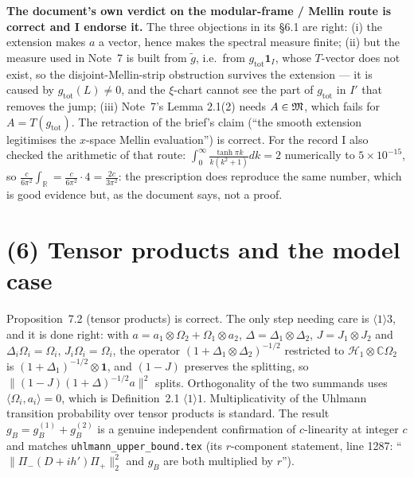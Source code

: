 \documentclass[11pt]{article}
\newcommand{\gt}{\widetilde g}
\newcommand{\ip}[2]{\langle#1,#2\rangle}
\newcommand{\norm}[1]{\lVert#1\rVert}
\newcommand{\gB}{g_B}
\newcommand{\Hil}{\mathcal H}
\newcommand{\one}{\mathbf 1}
\newcommand{\Om}{\Omega}
\newcommand{\gtot}{g_{\mathrm{tot}}}
\begin{document}
\begin{verdictok}
\textbf{The document's own verdict on the modular-frame / Mellin route is correct and I endorse it.}
The three objections in its \S6.1 are right: (i) the extension makes $a$ a vector, hence makes the spectral
measure finite; (ii) but the measure used in Note~7 is built from $\gt$, i.e.\ from $\gtot\one_I$, whose
$T$-vector does not exist, so the disjoint-Mellin-strip obstruction survives the extension --- it is caused
by $\gtot(L)\ne0$, and the $\xi$-chart cannot see the part of $\gtot$ in $I'$ that removes the jump;
(iii) Note~7's Lemma 2.1(2) needs $A\in\mathfrak M$, which fails for $A=T(\gtot)$.  The retraction of the brief's
claim (``the smooth extension legitimises the $x$-space Mellin evaluation'') is correct.  For the record I
also checked the arithmetic of that route: $\int_0^\infty\frac{\tanh\pi k}{k(k^2+1)}dk=2$ numerically to
$5\times10^{-15}$, so $\frac c{6\pi^2}\int_{\mathbb R}=\frac c{6\pi^2}\cdot4=\frac{2c}{3\pi^2}$: the
prescription does reproduce the same number, which is good evidence but, as the document says, not a proof.
\end{verdictok}


\section{(6) Tensor products and the model case}\label{r:tensor}

\begin{verdictok}
Proposition~7.2 (tensor products) is correct.  The only step needing care is $\langle1\rangle3$, and it is
done right: with $a=a_1\otimes\Om_2+\Om_1\otimes a_2$, $\Delta=\Delta_1\otimes\Delta_2$,
$J=J_1\otimes J_2$ and $\Delta_i\Om_i=\Om_i$, $J_i\Om_i=\Om_i$, the operator
$(1+\Delta_1\otimes\Delta_2)^{-1/2}$ restricted to $\Hil_1\otimes\mathbb C\Om_2$ is
$(1+\Delta_1)^{-1/2}\otimes\one$, and $(1-J)$ preserves the splitting, so
$\norm{(1-J)(1+\Delta)^{-1/2}a}^2$ splits.  Orthogonality of the two summands uses $\ip{\Om_i}{a_i}=0$,
which is Definition~2.1 $\langle1\rangle1$.  Multiplicativity of the Uhlmann transition probability over
tensor products is standard.  The result $\gB=\gB^{(1)}+\gB^{(2)}$ is a genuine independent confirmation of
$c$-linearity at integer $c$ and matches \texttt{uhlmann\_upper\_bound.tex} (its $r$-component statement,
line 1287: ``$\norm{\Pi_-(D+ih')\Pi_+}_2^2$ and $\gB$ are both multiplied by $r$'').
\end{verdictok}
\end{document}

